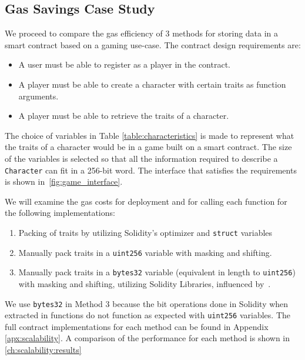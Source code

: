 \subsection{Gas Savings Case Study}

We proceed to compare the gas efficiency of 3 methods for storing data in a smart contract based on a gaming use-case. The contract design requirements are: 
\begin{itemize}
    \item A user must be able to register as a player in the contract.
    \item A player must be able to create a character with certain traits as function arguments.
    \item A player must be able to retrieve the traits of a character.
\end{itemize}




The choice of variables in Table \ref{table:characteristics} is made to represent what the traits of a character would be in a game built on a smart contract. The size of the variables is selected so that all the information required to describe a \texttt{Character} can fit in a 256-bit word. The interface that satisfies the requirements is shown in~\ref{fig:game_interface}.

We will examine the gas costs for deployment and for calling each function for the following implementations:

\begin{enumerate}
    \item Packing of traits by utilizing Solidity's optimizer and \texttt{struct} variables
    \item Manually pack traits in a \texttt{uint256} variable with masking and shifting.
    \item Manually pack traits in a \texttt{bytes32} variable (equivalent in length to \texttt{uint256}) with masking and shifting, utilizing Solidity Libraries, influenced by~\cite{virtualstruct}.
\end{enumerate}
We use \texttt{bytes32} in Method 3 because the bit operations done in Solidity when extracted in functions do not function as expected with \texttt{uint256} variables. The full contract implementations for each method can be found in Appendix \ref{apx:scalability}. A comparison of the performance for each method is shown in \ref{ch:scalability:results}%

